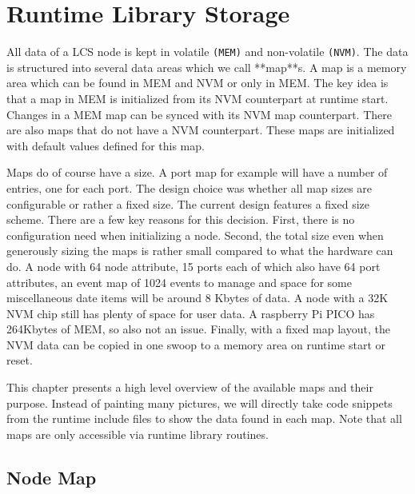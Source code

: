 \chapter{Runtime Library Storage}

All data of a LCS node is kept in volatile \texttt{(MEM)} and non-volatile \texttt{(NVM)}. The data is structured into several data areas which we call **map**s. A map is a memory area which can be found in MEM and NVM or only in MEM. The key idea is that a map in MEM is initialized from its NVM counterpart at runtime start. Changes in a MEM map can be synced with its NVM map counterpart. There are also maps that do not have a NVM counterpart. These maps are initialized with default values defined for this map. 

Maps do of course have a size. A port map for example will have a number of entries, one for each port. The design choice was whether all map sizes are configurable or rather a fixed size. The current design features a fixed size scheme. There are a few key reasons for this decision. First, there is no configuration need when initializing a node. Second, the total size even when generously sizing the maps is rather small compared to what the hardware can do. A node with 64 node attribute, 15 ports each of which also have 64 port attributes, an event map of 1024 events to manage and space for some miscellaneous date items will be around 8 Kbytes of data. A node with a 32K NVM chip still has plenty of space for user data. A raspberry Pi PICO has 264Kbytes of MEM, so also not an issue. Finally, with a fixed map layout, the NVM data can be copied in one swoop to a memory area on runtime start or reset. 

This chapter presents a high level overview of the available maps and their purpose. Instead of painting many pictures, we will directly take code snippets from the runtime include files to show the data found in each map. Note that all maps are only accessible via runtime library routines.

\section{Node Map}

